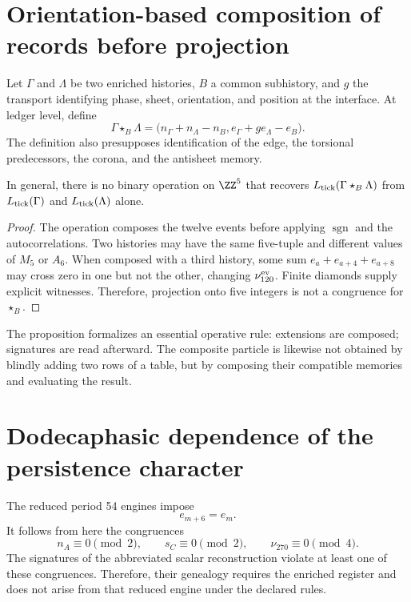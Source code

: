 \section{Orientation-based composition of records before projection}

Let \(\Gamma\) and \(\Lambda\) be two enriched histories, \(B\) a
common subhistory, and \(g\) the transport identifying phase, sheet,
orientation, and position at the interface. At ledger level, define
\[
 \boxed{
 \Gamma\star_B\Lambda
 =\bigl(n_\Gamma+n_\Lambda-n_B,
        e_\Gamma+g e_\Lambda-e_B\bigr).}
\]
The definition also presupposes identification of the edge, the
torsional predecessors, the corona, and the antisheet memory.

\begin{proposition}
\label{prop:no-descenso-empalme-cinco}
In general, there is no binary operation on \(\ZZ^5\) that recovers
\(L_{\rm tick}(\Gamma\star_B\Lambda)\) from
\(L_{\rm tick}(\Gamma)\) and \(L_{\rm tick}(\Lambda)\) alone.
\end{proposition}

\begin{proof}
The operation composes the twelve events before applying
\(\operatorname{sgn}\) and the autocorrelations. Two histories may have
the same five-tuple and different values of \(M_5\) or \(A_6\). When composed
with a third history, some sum
\(e_a+e_{a+4}+e_{a+8}\) may cross zero in one but not the other, changing
\(\nu_{120}^{\rm ev}\). Finite diamonds supply explicit witnesses.
Therefore, projection onto five integers is not
a congruence for \(\star_B\).
\end{proof}

The proposition formalizes an essential operative rule: extensions are
composed; signatures are read afterward. The composite particle is likewise
not obtained by blindly adding two rows of a table, but by composing their
compatible memories and evaluating the result.

\section{Dodecaphasic dependence of the persistence character}

The reduced period 54 engines impose
\[
 e_{m+6}=e_m.
\]
It follows from here the congruences
\[
 n_A\equiv0\pmod2,
 \qquad
 s_C\equiv0\pmod2,
 \qquad
 \nu_{270}\equiv0\pmod4.
\]
The signatures of the abbreviated scalar reconstruction violate at least one of
these congruences. Therefore, their genealogy requires the enriched register and
does not arise from that reduced engine under the declared rules.

